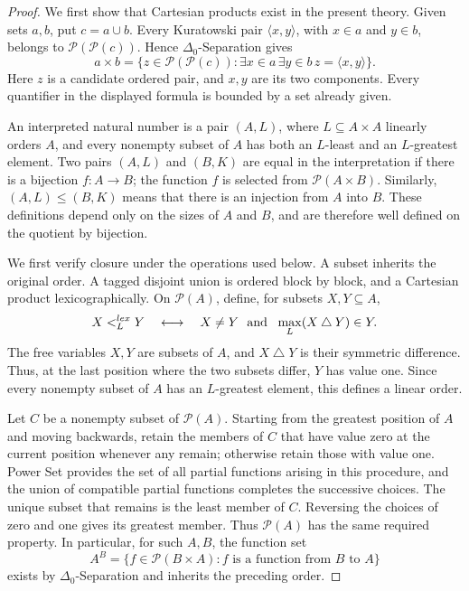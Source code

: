 \documentclass[10pt,a4paper]{amsart}
\begin{document}
\begin{proof}
  We first show that Cartesian products exist in the present theory. Given sets \(a,b\), put \(c=a\cup b\). Every Kuratowski pair \(\langle x,y\rangle\), with \(x\in a\) and \(y\in b\), belongs to \(\mathcal P(\mathcal P(c))\). Hence \(\Delta_0\)-Separation gives
  \[
  a\times b=\{z\in\mathcal P(\mathcal P(c)):
  \exists x\in a\,\exists y\in b\,z=\langle x,y\rangle\}.
  \]
  Here \(z\) is a candidate ordered pair, and \(x,y\) are its two components. Every quantifier in the displayed formula is bounded by a set already given.

  An interpreted natural number is a pair \((A,L)\), where \(L\subseteq A\times A\) linearly orders \(A\), and every nonempty subset of \(A\) has both an \(L\)-least and an \(L\)-greatest element. Two pairs \((A,L)\) and \((B,K)\) are equal in the interpretation if there is a bijection \(f:A\to B\); the function \(f\) is selected from \(\mathcal P(A\times B)\). Similarly, \((A,L)\leq(B,K)\) means that there is an injection from \(A\) into \(B\). These definitions depend only on the sizes of \(A\) and \(B\), and are therefore well defined on the quotient by bijection.

  We first verify closure under the operations used below. A subset inherits the original order. A tagged disjoint union is ordered block by block, and a Cartesian product lexicographically. On \(\mathcal P(A)\), define, for subsets \(X,Y\subseteq A\),
  \[
  X<_{L}^{\rm lex}Y
  \quad\longleftrightarrow\quad
  X\neq Y\ \text{ and }\ \max_L(X\mathbin\triangle Y)\in Y.
  \]
  The free variables \(X,Y\) are subsets of \(A\), and \(X\mathbin\triangle Y\) is their symmetric difference. Thus, at the last position where the two subsets differ, \(Y\) has value one. Since every nonempty subset of \(A\) has an \(L\)-greatest element, this defines a linear order.

  Let \(C\) be a nonempty subset of \(\mathcal P(A)\). Starting from the greatest position of \(A\) and moving backwards, retain the members of \(C\) that have value zero at the current position whenever any remain; otherwise retain those with value one. Power Set provides the set of all partial functions arising in this procedure, and the union of compatible partial functions completes the successive choices. The unique subset that remains is the least member of \(C\). Reversing the choices of zero and one gives its greatest member. Thus \(\mathcal P(A)\) has the same required property. In particular, for such \(A,B\), the function set
  \[
  A^B=\{f\in\mathcal P(B\times A):f\text{ is a function from }B\text{ to }A\}
  \]
  exists by \(\Delta_0\)-Separation and inherits the preceding order.


\end{proof}
\end{document}
